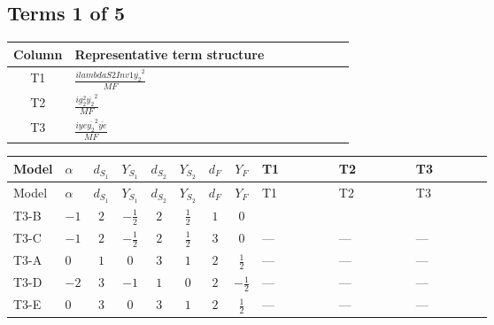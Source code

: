\documentclass[8pt]{article}
\begin{document}
\begin{landscape}
\subsection*{Terms 1 of 5}
\begin{center}
\begin{tabular}{@{}c >{\raggedright\arraybackslash}p{0.82\linewidth}@{}}
\toprule
Column & Representative term structure \\
\midrule
T1 & \(\displaystyle \frac{i lambdaS2Inv1 \overline{y_{2}}^{2}}{MF}\) \\
\midrule
T2 & \(\displaystyle \frac{i g_{2}^{2} \overline{y_{2}}^{2}}{MF}\) \\
\midrule
T3 & \(\displaystyle \frac{i ye \overline{y_{2}}^{2} \overline{ye}}{MF}\) \\
\midrule
\bottomrule
\end{tabular}
\end{center}
\smallskip
\tiny
\begin{longtable}{@{}llcccccc >{\raggedright\arraybackslash}p{0.21\linewidth} >{\raggedright\arraybackslash}p{0.21\linewidth} >{\raggedright\arraybackslash}p{0.21\linewidth}@{}}
\toprule
Model & $\alpha$ & $d_{S_1}$ & $Y_{S_1}$ & $d_{S_2}$ & $Y_{S_2}$ & $d_F$ & $Y_F$ & T1 & T2 & T3 \\
\midrule
\endfirsthead
\toprule
Model & $\alpha$ & $d_{S_1}$ & $Y_{S_1}$ & $d_{S_2}$ & $Y_{S_2}$ & $d_F$ & $Y_F$ & T1 & T2 & T3 \\
\midrule
\endhead
T3-B & $-1$ & $2$ & $-\frac{1}{2}$ & $2$ & $\frac{1}{2}$ & $1$ & $0$ & \scriptsize\adjustbox{max width=\linewidth}{$\begin{gathered} \frac{i lambdaS2Inv1 \overline{y_{2}}^{2}}{4 MF}\end{gathered}$} & \scriptsize\adjustbox{max width=\linewidth}{$\begin{gathered} \frac{3 i g_{2}^{2} \overline{y_{2}}^{2}}{8 MF}\end{gathered}$} & \scriptsize\adjustbox{max width=\linewidth}{$\begin{gathered} - \frac{i ye \overline{y_{2}}^{2} \overline{ye}}{8 MF}\end{gathered}$} \\
\midrule
T3-C & $-1$ & $2$ & $-\frac{1}{2}$ & $2$ & $\frac{1}{2}$ & $3$ & $0$ & --- & --- & --- \\
\midrule
T3-A & $0$ & $1$ & $0$ & $3$ & $1$ & $2$ & $\frac{1}{2}$ & --- & --- & --- \\
\midrule
T3-D & $-2$ & $3$ & $-1$ & $1$ & $0$ & $2$ & $-\frac{1}{2}$ & --- & --- & --- \\
\midrule
T3-E & $0$ & $3$ & $0$ & $3$ & $1$ & $2$ & $\frac{1}{2}$ & --- & --- & --- \\
\midrule
\bottomrule
\end{longtable}
\clearpage

\end{landscape}
\end{document}
